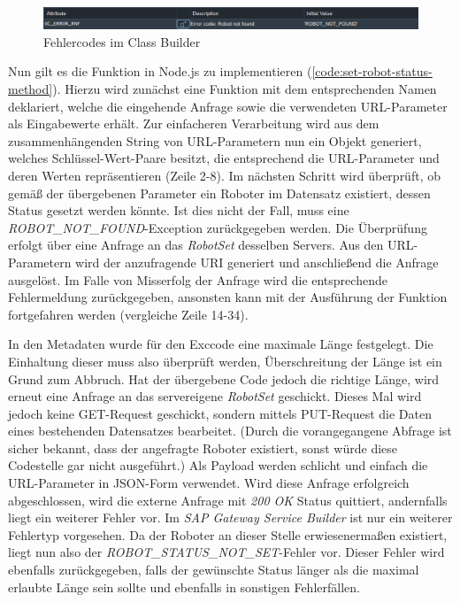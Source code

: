 \begin{figure}[!ht]
	\centering
	\includegraphics[width=\textwidth]{Bilder/ABAP/2020-12-04 10_22_23-Class Builder_ Display Class ZCL_ZEWM_ROBCO_DPC_EXT_cut.png}
	\caption{Fehlercodes im Class Builder}
	\label{fig:class-builder}
\end{figure}

Nun gilt es die Funktion in Node.js zu implementieren (\autoref{code:set-robot-status-method}).
Hierzu wird zunächst eine Funktion mit dem entsprechenden Namen deklariert, welche die eingehende Anfrage sowie die verwendeten URL-Parameter als Eingabewerte erhält.
Zur einfacheren Verarbeitung wird aus dem zusammenhängenden String von URL-Parametern nun ein Objekt generiert, welches Schlüssel-Wert-Paare besitzt, die entsprechend die URL-Parameter und deren Werten repräsentieren (Zeile 2-8).
Im nächsten Schritt wird überprüft, ob gemäß der übergebenen Parameter ein Roboter im Datensatz existiert, dessen Status gesetzt werden könnte.
Ist dies nicht der Fall, muss eine \emph{ROBOT\_NOT\_FOUND}-Exception zurückgegeben werden.
Die Überprüfung erfolgt über eine Anfrage an das \emph{RobotSet} desselben Servers.
Aus den URL-Parametern wird der anzufragende \ac{URI} generiert und anschließend die Anfrage ausgelöst.
Im Falle von Misserfolg der Anfrage wird die entsprechende Fehlermeldung zurückgegeben, ansonsten kann mit der Ausführung der Funktion fortgefahren werden (vergleiche Zeile 14-34).

In den Metadaten wurde für den Exccode eine maximale Länge festgelegt.
Die Einhaltung dieser muss also überprüft werden, Überschreitung der Länge ist ein Grund zum Abbruch.
Hat der übergebene Code jedoch die richtige Länge, wird erneut eine Anfrage an das servereigene \emph{RobotSet} geschickt.
Dieses Mal wird jedoch keine GET-Request geschickt, sondern mittels PUT-Request die Daten eines bestehenden Datensatzes bearbeitet.
(Durch die vorangegangene Abfrage ist sicher bekannt, dass der angefragte Roboter existiert, sonst würde diese Codestelle gar nicht ausgeführt.)
Als Payload werden schlicht und einfach die URL-Parameter in \ac{JSON}-Form verwendet.
Wird diese Anfrage erfolgreich abgeschlossen, wird die externe Anfrage mit \emph{200 OK} Status quittiert, andernfalls liegt ein weiterer Fehler vor.
Im \emph{SAP Gateway Service Builder} ist nur ein weiterer Fehlertyp vorgesehen.
Da der Roboter an dieser Stelle erwiesenermaßen existiert, liegt nun also der \emph{ROBOT\_STATUS\_NOT\_SET}-Fehler vor.
Dieser Fehler wird ebenfalls zurückgegeben, falls der gewünschte Status länger als die maximal erlaubte Länge sein sollte und ebenfalls in sonstigen Fehlerfällen.

